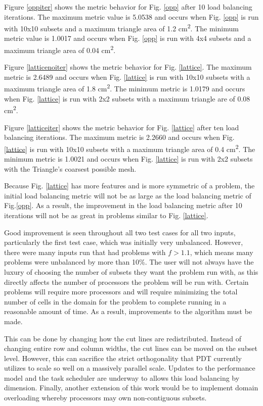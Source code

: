 \documentclass{anstrans}
\begin{document}
Figure \ref{oppiter} shows the metric behavior for Fig. \ref{opp} after 10 load balancing iterations. The maximum metric value is 5.0538 and occurs when Fig. \ref{opp} is run with 10x10 subsets and a maximum triangle area of 1.2 cm\textsuperscript{2}. The minimum metric value is 1.0017 and occurs when Fig. \ref{opp} is run with 4x4 subsets and a maximum triangle area of 0.04 cm\textsuperscript{2}.

Figure \ref{latticenoiter} shows the metric behavior for Fig. \ref{lattice}. The maximum metric is 2.6489 and occurs when Fig. \ref{lattice} is run with 10x10 subsets with a maximum triangle area of 1.8 cm\textsuperscript{2}. The minimum metric is 1.0179 and occurs when Fig. \ref{lattice} is run with 2x2 subsets with a maximum triangle are of 0.08 cm\textsuperscript{2}.


Figure \ref{latticeiter} shows the metric behavior for Fig. \ref{lattice} after ten load balancing iterations. The maximum metric is 2.2660 and occurs when Fig. \ref{lattice} is run with 10x10 subsets with a maximum triangle area of 0.4 cm\textsuperscript{2}. The minimum metric is 1.0021 and occurs when Fig. \ref{lattice} is run with 2x2 subsets with the Triangle's coarsest possible mesh.

Because Fig. \ref{lattice} has more features and is more symmetric of a problem, the initial load balancing metric will not be as large as the load balancing metric of Fig.\ref{opp}. As a result, the improvement in the load balancing metric after 10 iterations will not be as great in problems similar to Fig. \ref{lattice}. 

Good improvement is seen throughout all two test cases for all two inputs, particularly the first test case, which was initially very unbalanced. However, there were many inputs run that had problems with $f > 1.1$, which means many problems were unbalanced by more than 10\%. The user will not always have the luxury of choosing the number of subsets they want the problem run with, as this directly affects the number of processors the problem will be run with. Certain problems will require more processors and will require minimizing the total number of cells in the domain for the problem to complete running in a reasonable amount of time. As a result, improvements to the algorithm must be made. 

This can be done by changing how the cut lines are redistributed. Instead of changing entire row and column widths, the cut lines can be moved on the subset level. However, this can sacrifice the strict orthogonality that PDT currently utilizes to scale so well on a massively parallel scale. Updates to the performance model and the task scheduler are underway to allows this load balancing by dimension. Finally, another extension of this work would be to implement domain overloading
whereby processors may own non-contiguous subsets.
\end{document}
